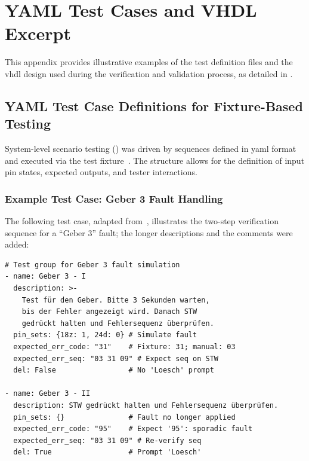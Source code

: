 \chapter{YAML Test Cases and VHDL Excerpt}
\label{app:test_cases}

This appendix provides illustrative examples of the test definition files and the \gls{vhdl} design used during the verification and validation process, as detailed in .

\section{YAML Test Case Definitions for Fixture-Based Testing}
\label{sec:app_yaml_test_cases}

System-level scenario testing () was driven by sequences defined in \gls{yaml} format and executed via the test fixture~\cite{dolata2023}. The structure allows for the definition of input pin states, expected outputs, and tester interactions.

\subsection*{Example Test Case: Geber 3 Fault Handling}
The following test case, adapted from~\cite[Listing~3]{dolata2023}, illustrates the two-step verification sequence for a \enquote{Geber 3} fault; the longer descriptions and the comments were added:

{\footnotesize
\begin{verbatim}
# Test group for Geber 3 fault simulation
- name: Geber 3 - I
  description: >-
    Test für den Geber. Bitte 3 Sekunden warten,
    bis der Fehler angezeigt wird. Danach STW
    gedrückt halten und Fehlersequenz überprüfen.
  pin_sets: {18z: 1, 24d: 0} # Simulate fault
  expected_err_code: "31"    # Fixture: 31; manual: 03
  expected_err_seq: "03 31 09" # Expect seq on STW
  del: False                 # No 'Loesch' prompt

- name: Geber 3 - II
  description: STW gedrückt halten und Fehlersequenz überprüfen.
  pin_sets: {}               # Fault no longer applied
  expected_err_code: "95"    # Expect '95': sporadic fault
  expected_err_seq: "03 31 09" # Re-verify seq
  del: True                  # Prompt 'Loesch'
\end{verbatim}
}

